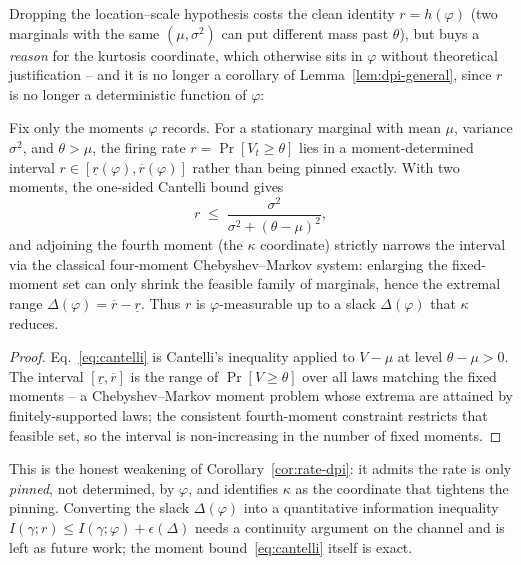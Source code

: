 ﻿\documentclass{article} %
\theoremstyle{remark}
\begin{document}
Dropping the location--scale hypothesis costs the clean identity $r=h(\varphi)$ (two marginals with
the same $(\mu,\sigma^2)$ can put different mass past $\theta$), but buys a \emph{reason} for the
kurtosis coordinate, which otherwise sits in $\varphi$ without theoretical justification -- and it is
no longer a corollary of Lemma~\ref{lem:dpi-general}, since $r$ is no longer a deterministic function
of $\varphi$:

\begin{proposition}
\label{prop:moment-bound}
Fix only the moments $\varphi$ records. For a stationary marginal with mean $\mu$, variance
$\sigma^2$, and $\theta>\mu$, the firing rate $r=\Pr[V_t\ge\theta]$ lies in a moment-determined
interval $r\in[\underline r(\varphi),\overline r(\varphi)]$ rather than being pinned exactly. With
two moments, the one-sided Cantelli bound gives
\begin{equation}
  r \;\le\; \frac{\sigma^2}{\sigma^2+(\theta-\mu)^2},
  \label{eq:cantelli}
\end{equation}
and adjoining the fourth moment (the $\kappa$ coordinate) strictly narrows the interval via the
classical four-moment Chebyshev--Markov system: enlarging the fixed-moment set can only shrink the
feasible family of marginals, hence the extremal range $\Delta(\varphi)=\overline r-\underline r$.
Thus $r$ is $\varphi$-measurable up to a slack $\Delta(\varphi)$ that $\kappa$ reduces.
\end{proposition}
\begin{proof}
Eq.~\eqref{eq:cantelli} is Cantelli's inequality applied to $V-\mu$ at level $\theta-\mu>0$. The
interval $[\underline r,\overline r]$ is the range of $\Pr[V\ge\theta]$ over all laws matching the
fixed moments -- a Chebyshev--Markov moment problem whose extrema are attained by finitely-supported
laws; the consistent fourth-moment constraint restricts that feasible set, so the interval is
non-increasing in the number of fixed moments.
\end{proof}
\noindent This is the honest weakening of Corollary~\ref{cor:rate-dpi}: it admits the rate is only
\emph{pinned}, not determined, by $\varphi$, and identifies $\kappa$ as the coordinate that tightens
the pinning. Converting the slack $\Delta(\varphi)$ into a quantitative information inequality
$I(\gamma;r)\le I(\gamma;\varphi)+\epsilon(\Delta)$ needs a continuity argument on the channel and is
left as future work; the moment bound~\eqref{eq:cantelli} itself is exact.
\end{document}
